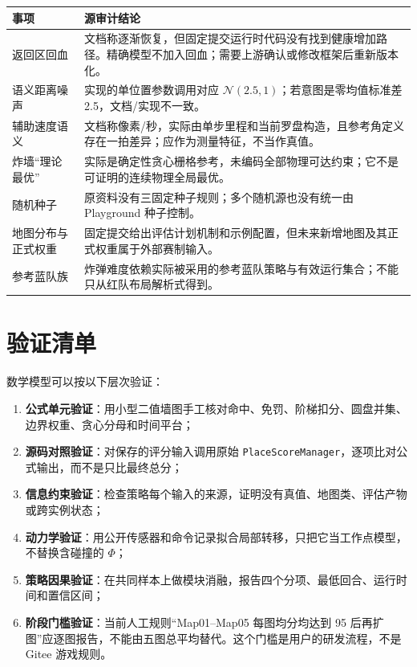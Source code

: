 \documentclass[UTF8,11pt]{ctexart}
\begin{document}
\begin{longtable}{p{}p{}}
\toprule
事项 & 源审计结论\\
\midrule
返回区回血 & 文档称逐渐恢复，但固定提交运行时代码没有找到健康增加路径。精确模型不加入回血；需要上游确认或修改框架后重新版本化。\\
语义距离噪声 & 实现的单位置参数调用对应 $\mathcal N(2.5,1)$；若意图是零均值标准差 2.5，文档/实现不一致。\\
辅助速度语义 & 文档称像素/秒，实际由单步里程和当前罗盘构造，且参考角定义存在一拍差异；应作为测量特征，不当作真值。\\
炸墙“理论最优” & 实际是确定性贪心栅格参考，未编码全部物理可达约束；它不是可证明的连续物理全局最优。\\
随机种子 & 原资料没有三固定种子规则；多个随机源也没有统一由 Playground 种子控制。\\
地图分布与正式权重 & 固定提交给出评估计划机制和示例配置，但未来新增地图及其正式权重属于外部赛制输入。\\
参考蓝队族 & 炸弹难度依赖实际被采用的参考蓝队策略与有效运行集合；不能只从红队布局解析式得到。\\
\bottomrule
\end{longtable}

\section{验证清单}

数学模型可以按以下层次验证：
\begin{enumerate}
  \item \textbf{公式单元验证}：用小型二值墙图手工核对命中、免罚、阶梯扣分、圆盘并集、边界权重、贪心分母和时间平台；
  \item \textbf{源码对照验证}：对保存的评分输入调用原始 \texttt{PlaceScoreManager}，逐项比对公式输出，而不是只比最终总分；
  \item \textbf{信息约束验证}：检查策略每个输入的来源，证明没有真值、地图类、评估产物或跨实例状态；
  \item \textbf{动力学验证}：用公开传感器和命令记录拟合局部转移，只把它当工作点模型，不替换含碰撞的 $\Phi$；
  \item \textbf{策略因果验证}：在共同样本上做模块消融，报告四个分项、最低回合、运行时间和置信区间；
  \item \textbf{阶段门槛验证}：当前人工规则“Map01--Map05 每图均分均达到 95 后再扩图”应逐图报告，不能由五图总平均替代。这个门槛是用户的研发流程，不是 Gitee 游戏规则。
\end{enumerate}
\end{document}
